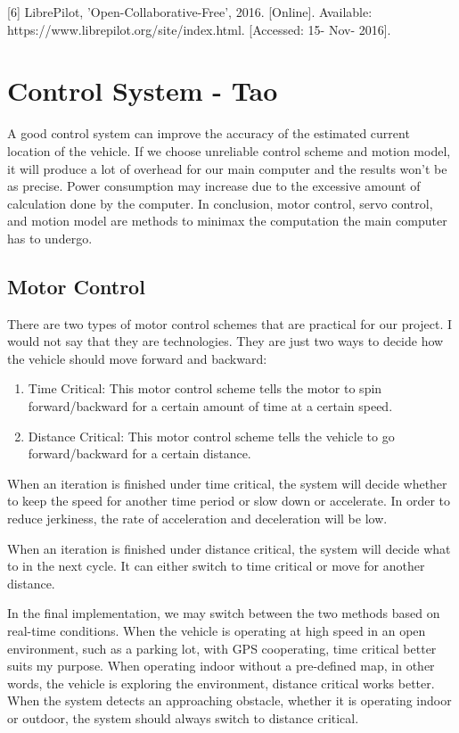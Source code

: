 \documentclass[compsoc,draftclsnofoot,onecolumn,10pt]{IEEEtran}
\begin{document}
[6] LibrePilot, 'Open-Collaborative-Free', 2016. [Online]. Available: https://www.librepilot.org/site/index.html. [Accessed: 15- Nov- 2016].\par

\newpage

\section{Control System - Tao}
A good control system can improve the accuracy of the estimated current location 
of the vehicle. If we choose unreliable control scheme and motion model, it will 
produce a lot of overhead for our main computer and the results won’t be as precise. 
Power consumption may increase due to the excessive amount of calculation done by 
the computer. In conclusion, motor control, servo control, and motion model are 
methods to minimax the computation the main computer has to undergo.

\subsection{Motor Control}
There are two types of motor control schemes that are practical for our project. 
I would not say that they are technologies. They are just two ways to decide 
how the vehicle should move forward and backward:
\begin{enumerate}
\item Time Critical: This motor control scheme tells the motor to spin 
forward/backward for a certain amount of time at a certain speed.
\item Distance Critical: This motor control scheme tells the vehicle to go 
forward/backward for a certain distance.
\end{enumerate}
When an iteration is finished under time critical, the system will decide whether 
to keep the speed for another time period or slow down or accelerate. In order 
to reduce jerkiness, the rate of acceleration and deceleration will be low.\par

When an iteration is finished under distance critical, the system will decide what 
to in the next cycle. It can either switch to time critical or move for another 
distance.\par

In the final implementation, we may switch between the two methods based on 
real-time conditions. When the vehicle is operating at high speed in an open 
environment, such as a parking lot, with GPS cooperating, time critical better 
suits my purpose. When operating indoor without a pre-defined map, in other words, 
the vehicle is exploring the environment, distance critical works better. When the 
system detects an approaching obstacle, whether it is operating indoor or outdoor, 
the system should always switch to distance critical.\par
\end{document}
